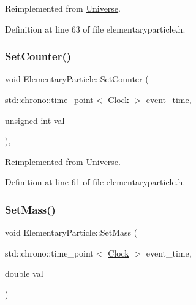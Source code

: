 Reimplemented from \hyperlink{class_universe_a3b3da7c86a7b75e5e5c0b7972ac82a87}{Universe}.



Definition at line 63 of file elementaryparticle.\+h.

\mbox{\label{class_elementary_particle_a141316fd968cce8ecc5aa11ce0757d63}} 
\subsubsection{\texorpdfstring{Set\+Counter()}{SetCounter()}}
{\footnotesize\ttfamily void Elementary\+Particle\+::\+Set\+Counter (\begin{DoxyParamCaption}\item[{std\+::chrono\+::time\+\_\+point$<$ \hyperlink{universe_8h_a0ef8d951d1ca5ab3cfaf7ab4c7a6fd80}{Clock} $>$}]{event\+\_\+time,  }\item[{unsigned int}]{val }\end{DoxyParamCaption})\hspace{0.3cm}{\ttfamily [inline]}, {\ttfamily [virtual]}}



Reimplemented from \hyperlink{class_universe_aa22202ae740eb1355529afcb13285e91}{Universe}.



Definition at line 61 of file elementaryparticle.\+h.

\mbox{\label{class_elementary_particle_a778ff8188ecb369e533521ed4f94b034}} 
\subsubsection{\texorpdfstring{Set\+Mass()}{SetMass()}}
{\footnotesize\ttfamily void Elementary\+Particle\+::\+Set\+Mass (\begin{DoxyParamCaption}\item[{std\+::chrono\+::time\+\_\+point$<$ \hyperlink{universe_8h_a0ef8d951d1ca5ab3cfaf7ab4c7a6fd80}{Clock} $>$}]{event\+\_\+time,  }\item[{double}]{val }\end{DoxyParamCaption})}



